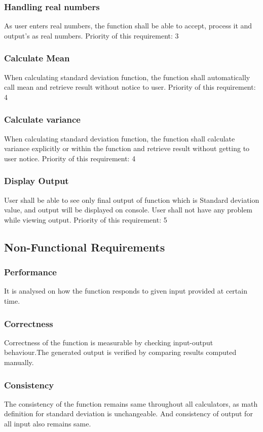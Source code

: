 \documentclass[a4paper,11pt]{article}
\begin{document}
\begin{titlepage}
\subsubsection{Handling real numbers}
As user enters real numbers, the function shall be able to accept, process it and output's as real numbers.\newline
Priority of this requirement: 3
\subsubsection{Calculate Mean}
When calculating standard deviation function, the function shall automatically call mean and retrieve result without notice to user. \newline
Priority of this requirement: 4
\subsubsection{Calculate variance}
When calculating standard deviation function, the function shall calculate variance explicitly or within the function and retrieve result without getting to user notice. \newline
Priority of this requirement: 4
\subsubsection{Display Output}
User shall be able to see only final output of function which is Standard deviation value, and output will be displayed on console. User shall not have any problem while viewing output. \newline
Priority of this requirement: 5
\subsection{Non-Functional Requirements}
\subsubsection{Performance}
It is analysed on how the function responds to given input provided at certain time. 
\subsubsection{Correctness}
Correctness of the function is measurable by checking input-output behaviour.The generated output is verified by comparing results computed manually.
\subsubsection{Consistency}
The consistency of the function remains same throughout all calculators, as math definition for standard deviation is unchangeable. And consistency of output for all input also remains same.

\end{titlepage}
\end{document}
